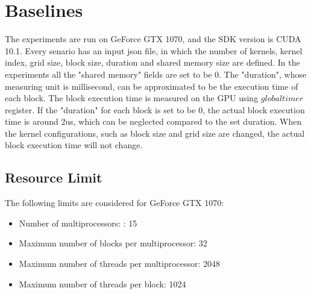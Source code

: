 \documentclass[conference]{IEEEtran}
\begin{document}
\section{Baselines}
The experiments are run on GeForce GTX 1070, and the SDK version is CUDA 10.1. Every senario has an input json file, in which the number of kernels, kernel index, grid size, block size, duration and shared memory size are defined. In the experiments all the "shared memory" fields are set to be 0. The "duration", whose measuring unit is millisecond, can be approximated to be the execution time of each block. The block execution time is measured on the GPU using $globaltimer$ register. If the "duration" for each block is set to be 0, the actual block execution time is around 2us, which can be neglected compared to the set duration. When the kernel configurations, such as block size and grid size are changed, the actual block execution time will not change.

\subsection{Resource Limit}
The following limits are considered for GeForce GTX 1070:
\begin{itemize}
   \item Number of multiprocessors: : 15
   \item Maximum number of blocks per multiprocessor: 32
   \item Maximum number of threads per multiprocessor: 2048
   \item Maximum number of threads per block: 1024
\end{itemize}
\end{document}
